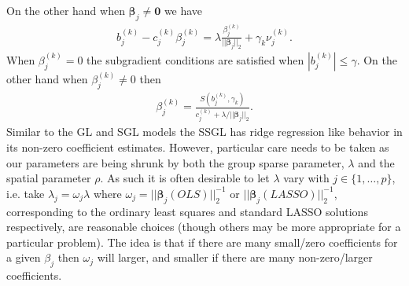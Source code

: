 \documentclass{article}
\numberwithin{equation}{section}
\theoremstyle{plain}
\newcommand{\bs}{\boldsymbol}
\begin{document}
On the other hand when $\bs\beta_j \neq \mathbf{0}$ we have
\begin{align}
\label{EQ:NZERO}
b_j^{(k)} - c_j^{(k)} \beta_j^{(k)}
 = 
\lambda \frac{\beta_j^{(k)}}{||\bs\beta_j||_2} + \gamma_k \nu_j^{(k)}.
\end{align}
\noindent When $\beta_j^{(k)} = 0$ the subgradient conditions are satisfied
when 
$|b_j^{(k)}| \leq \gamma.$
On the other hand when $\beta_j^{(k)} \neq 0$ then
\begin{align*}
\beta_j^{(k)} =
\frac{S(b_j^{(k)}, \gamma_k)}{c_j^{(k)} + \lambda/||\bs\beta_j||_2}.
\end{align*} 
\noindent Similar to the GL and SGL models the SSGL has ridge
regression like behavior in its non-zero coefficient estimates. However,
particular care needs to be taken as our parameters are being shrunk
by both the group sparse parameter, $\lambda$ and the spatial parameter
$\rho$. As such it is often desirable to let $\lambda$ vary with $j \in
\{1,\ldots,p\}$, i.e. take $\lambda_j = \omega_j \lambda$ where $\omega_j =
||\bs\beta_j(OLS)||_2^{-1}$ or $||\bs\beta_j(LASSO)||_2^{-1}$,
corresponding to the ordinary least squares and standard LASSO solutions
respectively, are reasonable choices (though others may be more appropriate for
a particular problem).
The idea is that if there are many small/zero coefficients for a given
$\beta_j$ then $\omega_j$ will larger, and smaller if there are many
non-zero/larger coefficients.
\end{document}
